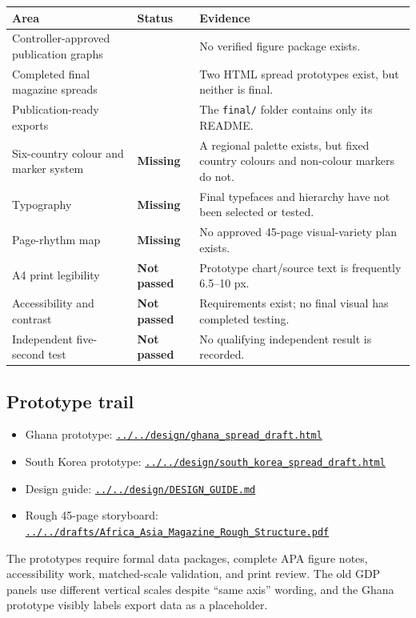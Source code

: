 \documentclass[10pt,a4paper]{article}
\newcommand{\pathcode}[1]{\href{run:#1}{\nolinkurl{#1}}}
\begin{document}
\begin{tabularx}{\textwidth}{>{\RaggedRight\arraybackslash}X >{\bfseries\RaggedRight\arraybackslash}p{32mm} >{\RaggedRight\arraybackslash}p{78mm}}
\toprule
Area & Status & Evidence \\
\midrule
Controller-approved publication graphs & 0 & No verified figure package exists. \\
Completed final magazine spreads & 0 & Two HTML spread prototypes exist, but neither is final. \\
Publication-ready exports & 0 & The \texttt{final/} folder contains only its README. \\
Six-country colour and marker system & Missing & A regional palette exists, but fixed country colours and non-colour markers do not. \\
Typography & Missing & Final typefaces and hierarchy have not been selected or tested. \\
Page-rhythm map & Missing & No approved 45-page visual-variety plan exists. \\
A4 print legibility & Not passed & Prototype chart/source text is frequently 6.5--10 px. \\
Accessibility and contrast & Not passed & Requirements exist; no final visual has completed testing. \\
Independent five-second test & Not passed & No qualifying independent result is recorded. \\
\bottomrule
\end{tabularx}

\subsection{Prototype trail}

\begin{itemize}
  \item Ghana prototype: \pathcode{../../design/ghana_spread_draft.html}
  \item South Korea prototype: \pathcode{../../design/south_korea_spread_draft.html}
  \item Design guide: \pathcode{../../design/DESIGN_GUIDE.md}
  \item Rough 45-page storyboard: \pathcode{../../drafts/Africa_Asia_Magazine_Rough_Structure.pdf}
\end{itemize}

The prototypes require formal data packages, complete APA figure notes, accessibility work, matched-scale validation, and print review. The old GDP panels use different vertical scales despite “same axis” wording, and the Ghana prototype visibly labels export data as a placeholder.
\end{document}
